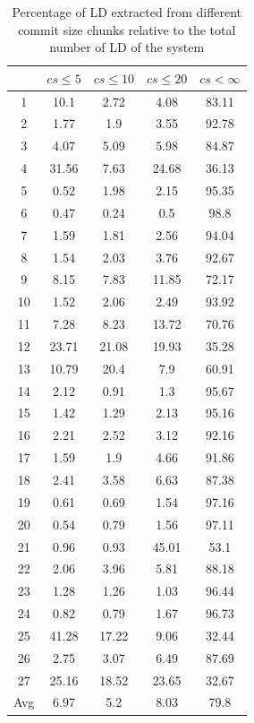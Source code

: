 \documentclass[a4paper,twoside]{article}
\begin{document}
\begin{table}[!h]
\renewcommand{\arraystretch}{1.25}
\caption{Percentage of LD extracted from different commit size chunks relative to the total number of LD of the system }
\label{table:6}
\centering
\begin{tabular}{|c|c|c|c|c|}
\hline
   &	$cs\leq 5$	&	$cs\leq 10$	&	$cs\leq 20$	&	$cs< \infty$	\\
\hline
1	&	10.1	&	2.72	&	4.08	&	83.11	\\
2	&	1.77	&	1.9	&	3.55	&	92.78	\\
3	&	4.07	&	5.09	&	5.98	&	84.87	\\
4	&	31.56	&	7.63	&	24.68	&	36.13	\\
5	&	0.52	&	1.98	&	2.15	&	95.35	\\
6	&	0.47	&	0.24	&	0.5	&	98.8	\\
7	&	1.59	&	1.81	&	2.56	&	94.04	\\
8	&	1.54	&	2.03	&	3.76	&	92.67	\\
9	&	8.15	&	7.83	&	11.85	&	72.17	\\
10	&	1.52	&	2.06	&	2.49	&	93.92	\\
11	&	7.28	&	8.23	&	13.72	&	70.76	\\
12	&	23.71	&	21.08	&	19.93	&	35.28	\\
13	&	10.79	&	20.4	&	7.9	&	60.91	\\
14	&	2.12	&	0.91	&	1.3	&	95.67	\\
15	&	1.42	&	1.29	&	2.13	&	95.16	\\
16	&	2.21	&	2.52	&	3.12	&	92.16	\\
17	&	1.59	&	1.9	&	4.66	&	91.86	\\
18	&	2.41	&	3.58	&	6.63	&	87.38	\\
19	&	0.61	&	0.69	&	1.54	&	97.16	\\
20	&	0.54	&	0.79	&	1.56	&	97.11	\\
21	&	0.96	&	0.93	&	45.01	&	53.1	\\
22	&	2.06	&	3.96	&	5.81	&	88.18	\\
23	&	1.28	&	1.26	&	1.03	&	96.44	\\
24	&	0.82	&	0.79	&	1.67	&	96.73	\\
25	&	41.28	&	17.22	&	9.06	&	32.44	\\
26	&	2.75	&	3.07	&	6.49	&	87.69	\\
27	&	25.16	&	18.52	&	23.65	&	32.67	\\

\hline
Avg	&	6.97	&	5.2	&	8.03	&	79.8	\\
\hline
\end{tabular}
\end{table}
\end{document}
